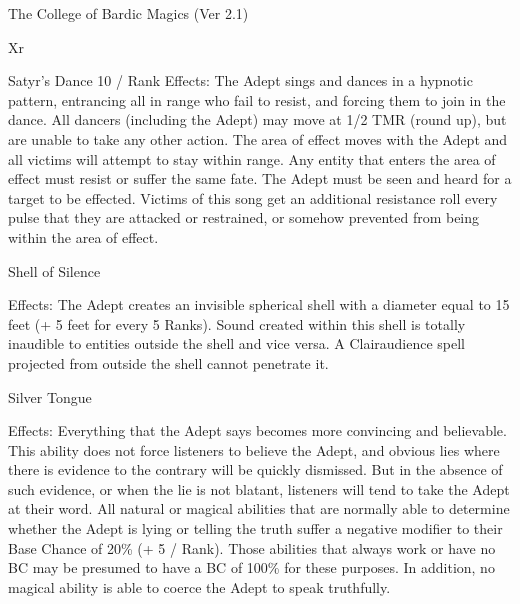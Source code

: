 \begin{Chapter}{The College of Bardic Magics (Ver 2.1)}
\begin{tarularx}{\columnwidth}{Xr}
\begin{spell}[S-9]{Satyr’s Dance}
10 / Rank 
Effects: The  Adept sings and dances in a hypnotic 
pattern,  entrancing  all  in  range  who  fail  to  resist, 
and  forcing  them to  join  in the  dance.  All  dancers 
(including  the  Adept)  may  move  at  1/2  TMR 
(round up), but are unable to take any other action. 
The  area  of  effect  moves  with  the  Adept  and  all 
victims  will  attempt  to  stay  within  range.  Any 
entity  that  enters  the  area  of  effect  must  resist  or 
suffer  the  same  fate.  The  Adept  must  be  seen  and 
heard  for  a  target  to  be  effected.  Victims  of  this 
song  get  an  additional  resistance  roll  every  pulse 
that  they  are  attacked  or  restrained,  or  somehow 
prevented from being within the area of effect. 
\end{spell}

\begin{spell}[S-10]{Shell of Silence }

Effects:  The  Adept  creates  an  invisible  spherical 
shell  with a diameter equal to 15 feet (+ 5 feet for 
every  5  Ranks).  Sound  created  within  this  shell  is 
totally  inaudible  to  entities  outside  the  shell  and 
vice  versa.  A  Clairaudience  spell  projected  from 
outside the shell cannot penetrate it. 
\end{spell}

\begin{spell}[S-11]{Silver Tongue }


Effects:  Everything  that  the  Adept  says  becomes 
more  convincing  and  believable.  This  ability  does 
not  force  listeners  to  believe  the  Adept,  and  obvious lies where there is evidence to the contrary will 
be  quickly  dismissed.  But  in  the  absence  of  such 
evidence,  or  when  the  lie  is  not  blatant,  listeners 
will tend to take the Adept at their word. All natural  or  magical  abilities  that  are  normally  able  to 
determine whether the Adept is lying or telling the 
truth  suffer  a  negative  modifier  to  their  Base 
Chance  of  20\%  (+  5  /  Rank).  Those  abilities  that 
always  work  or  have  no  BC  may  be  presumed  to 
have a BC of 100\% for these purposes. In addition, 
no  magical  ability  is  able  to  coerce  the  Adept  to 
speak truthfully. 
\end{spell}


\end{tarularx}
\end{Chapter}
